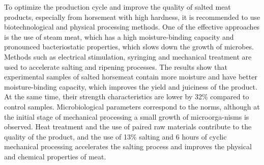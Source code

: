 To optimize the production cycle and improve the quality of salted meat
products, especially from horsemeat with high hardness, it is
recommended to use biotechnological and physical processing methods. One
of the effective approaches is the use of steam meat, which has a high
moisture-binding capacity and pronounced bacteriostatic properties,
which slows down the growth of microbes. Methods such as electrical
stimulation, syringing and mechanical treatment are used to accelerate
salting and ripening processes. The results show that experimental
samples of salted horsemeat contain more moisture and have better
moisture-binding capacity, which improves the yield and juiciness of the
product. At the same time, their strength characteristics are lower by
32\% compared to control samples. Microbiological parameters correspond
to the norms, although at the initial stage of mechanical processing a
small growth of microorga-nisms is observed. Heat treatment and the use
of paired raw materials contribute to the quality of the product, and
the use of 13\% salting and 6 hours of cyclic mechanical processing
accelerates the salting process and improves the physical and chemical
properties of meat.

